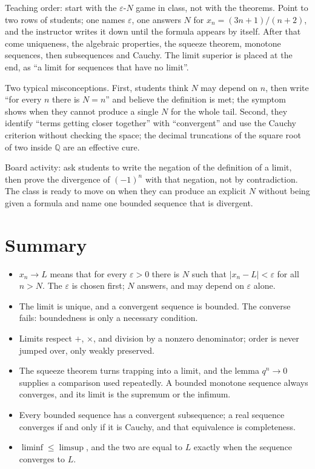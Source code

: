 \begin{untukdosen}
Teaching order: start with the $\varepsilon$-$N$ game in class, not with the theorems.
Point to two rows of students; one names $\varepsilon$, one answers $N$ for
$x_n=(3n+1)/(n+2)$, and the instructor writes it down until the formula appears by
itself. After that come uniqueness, the algebraic properties, the squeeze theorem,
monotone sequences, then subsequences and Cauchy. The limit superior is placed at the
end, as ``a limit for sequences that have no limit''.

Two typical misconceptions. First, students think $N$ may depend on $n$, then write
``for every $n$ there is $N=n$'' and believe the definition is met; the symptom shows
when they cannot produce a single $N$ for the whole tail. Second, they identify ``terms
getting closer together'' with ``convergent'' and use the Cauchy criterion without
checking the space; the decimal truncations of the square root of two inside
$\mathbb{Q}$ are an effective cure.

Board activity: ask students to write the negation of the definition of a limit, then
prove the divergence of $(-1)^n$ with that negation, not by contradiction. The class is
ready to move on when they can produce an explicit $N$ without being given a formula
and name one bounded sequence that is divergent.
\end{untukdosen}

\section{Summary}

\begin{ringkasan}
\begin{itemize}
  \item $x_n \to L$ means that for every $\varepsilon>0$ there is $N$ such that
        $|x_n-L|<\varepsilon$ for all $n>N$. The $\varepsilon$ is chosen first; $N$
        answers, and may depend on $\varepsilon$ alone.
  \item The limit is unique, and a convergent sequence is bounded. The converse fails:
        boundedness is only a necessary condition.
  \item Limits respect $+$, $\times$, and division by a nonzero denominator; order is
        never jumped over, only weakly preserved.
  \item The squeeze theorem turns trapping into a limit, and the lemma $q^n \to 0$
        supplies a comparison used repeatedly. A bounded monotone sequence always
        converges, and its limit is the supremum or the infimum.
  \item Every bounded sequence has a convergent subsequence; a real sequence converges
        if and only if it is Cauchy, and that equivalence is completeness.
  \item $\liminf \le \limsup$, and the two are equal to $L$ exactly when the sequence
        converges to $L$.
\end{itemize}
\end{ringkasan}

